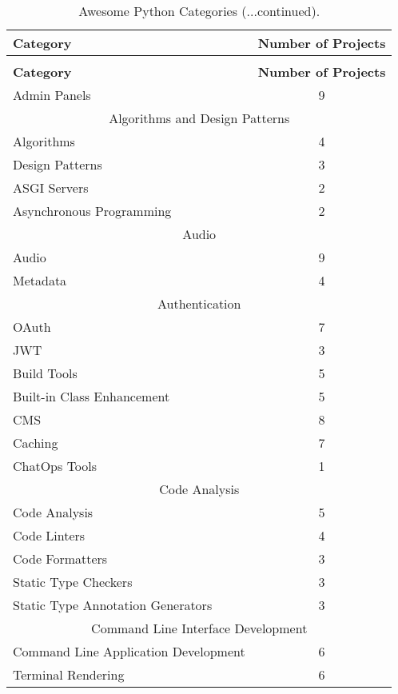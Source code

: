 
\centering
\begin{longtable} {|l|c|}
    \caption[Awesome Python Categories]{Awesome Python Categories. \label{table:awesome-python-categories}}\\
    \hline
    \textbf{Category} & \textbf{Number of Projects}\\
    \hline
    \endfirsthead
    \caption[]{Awesome Python Categories (...continued).}\\
    \hline
    \textbf{Category} & \textbf{Number of Projects}\\
    \hline
    \endhead
    \hline
    \endfoot
    Admin Panels & 9\\
    \hline
    \multicolumn{2}{|c|}{Algorithms and Design Patterns}\\
    \hline
    Algorithms & 4\\
    Design Patterns & 3\\
    \hline
    ASGI Servers & 2\\
    \hline
    Asynchronous Programming & 2\\
    \hline
    \multicolumn{2}{|c|}{Audio}\\
    \hline
    Audio & 9\\
    Metadata & 4\\
    \hline
    \multicolumn{2}{|c|}{Authentication}\\
    \hline
    OAuth & 7\\
    JWT & 3\\
    \hline
    Build Tools & 5\\
    \hline
    Built-in Class Enhancement & 5\\
    \hline
    CMS & 8\\
    \hline
    Caching & 7\\
    \hline
    ChatOps Tools & 1\\
    \hline
    \multicolumn{2}{|c|}{Code Analysis}\\
    \hline
    Code Analysis & 5\\
    Code Linters & 4\\
    Code Formatters & 3\\
    Static Type Checkers & 3\\
    Static Type Annotation Generators & 3\\
    \hline
    \multicolumn{2}{|c|}{Command Line Interface Development}\\
    \hline
    Command Line Application Development & 6\\
    Terminal Rendering & 6\\

\end{longtable}
